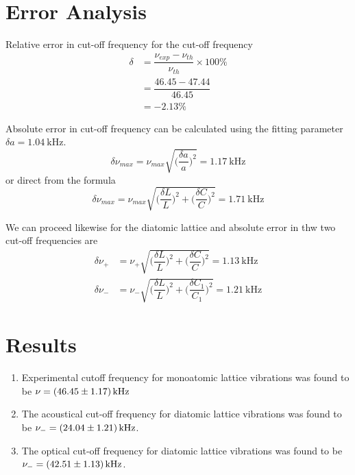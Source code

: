 \documentclass[%
 aip,
 amsmath,amssymb,
 reprint, floatfix%
]{revtex4-1}
\begin{document}
\section{Error Analysis}
    Relative error in cut-off frequency for the cut-off frequency
    \begin{equation}
        \begin{split}
            \delta &= \dfrac{\nu_{exp} - \nu_{th}}{\nu_{th}} \times 100\% \\
            &= \dfrac{46.45-47.44}{46.45} \\
            &= -2.13 \%
        \end{split}
    \end{equation}
    \par
    Absolute error in cut-off frequency can be calculated using the fitting parameter $\delta a = \SI{1.04}{\kilo \hertz}$.
    \begin{equation}
        \delta \nu_{max} = \nu_{max} \sqrt{\Big(\dfrac{\delta a}{a}\Big)^2} = \SI{1.17}{\kilo \hertz}
    \end{equation}
    or direct from the formula
    \begin{equation}
        \delta \nu_{max} = \nu_{max} \sqrt{\Big(\dfrac{\delta L}{L}\Big)^2+\Big(\dfrac{\delta C}{C}\Big)^2} = \SI{1.71}{\kilo \hertz}
    \end{equation}
    \par
    We can proceed likewise for the diatomic lattice and absolute error in thw two cut-off frequencies are
    \begin{equation}
        \begin{split}
            \delta \nu_{+} &= \nu_{+} \sqrt{\Big(\dfrac{\delta L}{L}\Big)^2+\Big(\dfrac{\delta C}{C}\Big)^2} = \SI{1.13}{\kilo \hertz} \\
            \delta \nu_{-} &= \nu_{-} \sqrt{\Big(\dfrac{\delta L}{L}\Big)^2+\Big(\dfrac{\delta C_1}{C_1}\Big)^2} = \SI{1.21}{\kilo \hertz}
        \end{split}
    \end{equation}
    
\section{Results}
    \begin{enumerate}
        \item Experimental cutoff frequency for monoatomic lattice vibrations was found to be $\nu = \SI[separate-uncertainty=true]{46.45\pm 1.17}{\kilo \hertz}$
        \item The acoustical cut-off frequency for diatomic lattice vibrations was found to be $\nu_{-} = \SI[separate-uncertainty=true]{24.04\pm 1.21}{\kilo \hertz}$.
        \item The optical cut-off frequency for diatomic lattice vibrations was found to be $\nu_{-} = \SI[separate-uncertainty=true]{42.51\pm 1.13}{\kilo \hertz}$.
    \end{enumerate}
\end{document}
